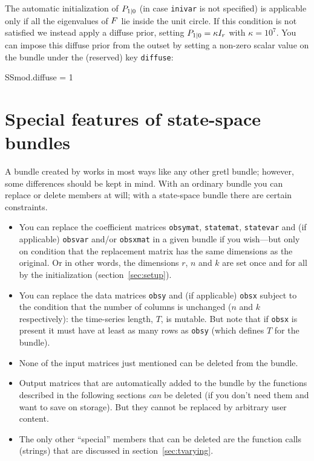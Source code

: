 \documentclass[a4paper]{article}
\begin{document}
The automatic initialization of $P_{1|0}$ (in case
\texttt{inivar} is not specified) is applicable only if all the
eigenvalues of $F$ lie inside the unit circle.  If this
condition is not satisfied we instead apply a diffuse prior, setting
$P_{1|0} = \kappa I_r$ with $\kappa = 10^7$.  You can
impose this diffuse prior from the outset by setting a non-zero scalar
value on the bundle under the (reserved) key \texttt{diffuse}:
%
\begin{code}
SSmod.diffuse = 1
\end{code}

\section{Special features of state-space bundles}
\label{sec:ss-special}

A bundle created by  works in most ways like any other
gretl bundle; however, some differences should be kept in mind.  With
an ordinary bundle you can replace or delete members at will; with a
state-space bundle there are certain constraints.

\begin{itemize}
\item You can replace the coefficient matrices \texttt{obsymat},
  \texttt{statemat}, \texttt{statevar} and (if applicable)
  \texttt{obsvar} and/or \texttt{obsxmat} in a given bundle if you
  wish---but only on condition that the replacement matrix has the
  same dimensions as the original. Or in other words, the dimensions
  $r$, $n$ and $k$ are set once and for all by the initialization
  (section~\ref{sec:setup}).
\item You can replace the data matrices \texttt{obsy} and (if
  applicable) \texttt{obsx} subject to the condition that the number
  of columns is unchanged ($n$ and $k$ respectively): the time-series
  length, $T$, is mutable. But note that if \texttt{obsx} is present
  it must have at least as many rows as \texttt{obsy} (which defines
  $T$ for the bundle).
\item None of the input matrices just mentioned can be deleted from
  the bundle.
\item Output matrices that are automatically added to the bundle by
  the functions described in the following sections \textit{can} be
  deleted (if you don't need them and want to save on storage). But
  they cannot be replaced by arbitrary user content.
\item The only other ``special'' members that can be deleted are the
  function calls (strings) that are discussed in
  section~\ref{sec:tvarying}.
\end{itemize}
\end{document}
